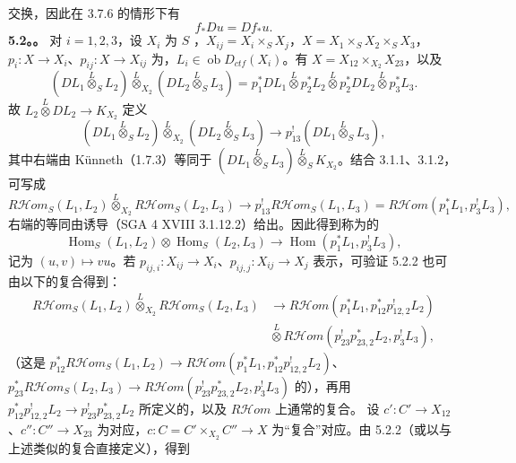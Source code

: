交换，因此在 3.7.6 的情形下有
\[f_*Du=Df_*u.\tag{5.1.8}\]
\textbf{5.2。。} 对 $i=1,2,3$，设 $X_i$ 为 $S$ ，$X_{ij}=X_i\times_SX_j$，$X=X_1\times_SX_2\times_SX_3$，$p_i:X\to X_i$、$p_{ij}:X\to X_{ij}$ 为，$L_i\in\operatorname{ob}D_{ctf}(X_i)$。有 $X=X_{12}\times_{X_2}X_{23}$，以及
\[(DL_1\mathbin{\overset L\otimes}_SL_2)\mathbin{\overset L\otimes}_{X_2}(DL_2\mathbin{\overset L\otimes}_SL_3)=p_1^*DL_1\mathbin{\overset L\otimes}p_2^*L_2\mathbin{\overset L\otimes}p_2^*DL_2\mathbin{\overset L\otimes}p_3^*L_3.\]
故 $L_2\mathbin{\overset L\otimes}DL_2\to K_{X_2}$ 定义
\[(DL_1\mathbin{\overset L\otimes}_SL_2)\mathbin{\overset L\otimes}_{X_2}(DL_2\mathbin{\overset L\otimes}_SL_3)\longrightarrow p_{13}^!(DL_1\mathbin{\overset L\otimes}_SL_3),\tag{5.2.1}\]
其中右端由 Künneth（1.7.3）等同于 $(DL_1\mathbin{\overset L\otimes}_SL_3)\mathbin{\overset L\otimes}_SK_{X_2}$。结合 3.1.1、3.1.2，可写成
\[R\mathcal Hom_S(L_1,L_2)\mathbin{\overset L\otimes}_{X_2}R\mathcal Hom_S(L_2,L_3)\longrightarrow p_{13}^!R\mathcal Hom_S(L_1,L_3)=R\mathcal Hom(p_1^*L_1,p_3^!L_3),\tag{5.2.2}\]
右端的等同由诱导（SGA 4 XVIII 3.1.12.2）给出。因此得到称为的
\[\operatorname{Hom}_S(L_1,L_2)\otimes\operatorname{Hom}_S(L_2,L_3)\longrightarrow\operatorname{Hom}(p_1^*L_1,p_3^!L_3),\tag{5.2.3}\]
记为 $(u,v)\mapsto vu$。若 $p_{ij,i}:X_{ij}\to X_i$、$p_{ij,j}:X_{ij}\to X_j$ 表示，可验证 5.2.2 也可由以下的复合得到：
\[\begin{split}
R\mathcal Hom_S(L_1,L_2)\mathbin{\overset L\otimes}_{X_2}R\mathcal Hom_S(L_2,L_3)&\longrightarrow R\mathcal Hom(p_1^*L_1,p_{12}^*p_{12,2}^!L_2)\\&\mathbin{\overset L\otimes}R\mathcal Hom(p_{23}^!p_{23,2}^*L_2,p_3^!L_3),
\end{split}\]
（这是 $p_{12}^*R\mathcal Hom_S(L_1,L_2)\to R\mathcal Hom(p_1^*L_1,p_{12}^*p_{12,2}^!L_2)$、$p_{23}^*R\mathcal Hom_S(L_2,L_3)\to R\mathcal Hom(p_{23}^!p_{23,2}^*L_2,p_3^!L_3)$ 的），再用 $p_{12}^*p_{12,2}^!L_2\to p_{23}^!p_{23,2}^*L_2$ 所定义的，以及 $R\mathcal Hom$ 上通常的复合。
设 $c':C'\to X_{12}$、$c'':C''\to X_{23}$ 为对应，$c:C=C'\times_{X_2}C''\to X$ 为“复合”对应。由 5.2.2（或以与上述类似的复合直接定义），得到
